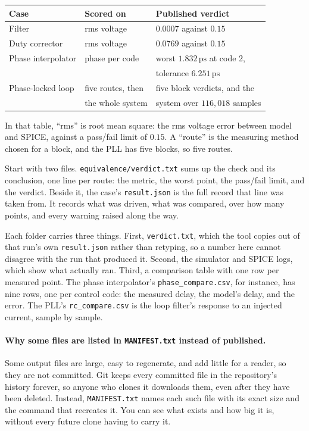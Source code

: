 \documentclass[11pt,a4paper]{article}
\newcommand{\unit}[1]{\,\textrm{#1}}
\begin{document}
\begin{center}
\begin{tabular}{@{}lll@{}}
\toprule
\textbf{Case} & \textbf{Scored on} & \textbf{Published verdict} \\
\midrule
Filter        & rms voltage        & $0.0007$ against $0.15$ \\
Duty corrector & rms voltage       & $0.0769$ against $0.15$ \\
Phase interpolator & phase per code & worst $1.832\unit{ps}$ at code 2, \\
              &                    & tolerance $6.251\unit{ps}$ \\
Phase-locked loop & five routes, then & five block verdicts, and the \\
              & the whole system   & system over $116{,}018$ samples \\
\bottomrule
\end{tabular}
\end{center}

\noindent In that table, ``rms'' is root mean square: the rms voltage
error between model and SPICE, against a pass/fail limit of $0.15$. A
``route'' is the measuring method chosen for a block, and the PLL has
five blocks, so five routes.

Start with two files. \texttt{equivalence/verdict.txt} sums up the
check and its conclusion, one line per route: the metric, the worst
point, the pass/fail limit, and the verdict. Beside it, the case's
\texttt{result.json} is the full record that line was taken from. It
records what was driven, what was compared, over how many points, and
every warning raised along the way.

Each folder carries three things. First, \texttt{verdict.txt}, which
the tool copies out of that run's own \texttt{result.json} rather than
retyping, so a number here cannot disagree with the run that produced
it. Second, the simulator and SPICE logs, which show what actually
ran. Third, a comparison table with one row per measured point. The
phase interpolator's \texttt{phase\_compare.csv}, for instance, has
nine rows, one per control code: the measured delay, the model's
delay, and the error. The PLL's \texttt{rc\_compare.csv} is the loop
filter's response to an injected current, sample by sample.

\paragraph{Why some files are listed in \texttt{MANIFEST.txt} instead of published.}
Some output files are large, easy to regenerate, and add little for a
reader, so they are not committed. Git keeps every committed file in
the repository's history forever, so anyone who clones it downloads
them, even after they have been deleted. Instead,
\texttt{MANIFEST.txt} names each such file with its exact size and the
command that recreates it. You can see what exists and how big it is,
without every future clone having to carry it.
\end{document}
